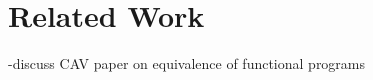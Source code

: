 \section{Related Work}
\label{sec:related-work}

\cite{jhala11}

-discuss CAV paper on equivalence of functional programs


